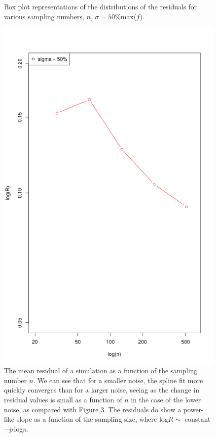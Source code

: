 \documentclass[11pt]{article}
\begin{document}
\begin{homeworkProblem}
\begin{figure}[!ht]
\begin{centering}
                \caption{Box plot representations of the distributions of the
                    residuals for various sampling numbers, $n$, $\sigma =
                    50\%$max($f$).}

            \end{centering}
        \end{figure}

        \begin{figure}[!ht]
            
            \begin{centering}
                \includegraphics[scale=0.6]{hw8_2_logR_vs_logn.png}

                \caption{The mean residual of a simulation as a function of the
                    sampling number $n$. We can see that for a smaller noise,
                    the spline fit more quickly converges than for a larger
                    noise, seeing as the change in residual values is small as
                a function of $n$ in the case of the lower noise, as compared
            with Figure 3. The residuals do show a power-like slope as a
        function of the sampling size, where log$R \sim$ constant $-p$\,log$n$.}


\end{centering}
\end{figure}
\end{homeworkProblem}
\end{document}
